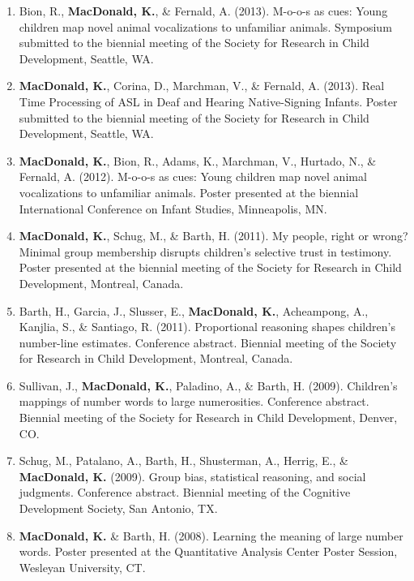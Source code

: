 \documentclass[10pt]{article}
\makeatletter
\newlength{\bibhang}
\newlength{\bibsep}
 {\@listi \global\bibsep\itemsep \global\advance\bibsep by\parsep}
\newenvironment{bibsection}%
        {\begin{enumerate}{}{%
       \setlength{\leftmargin}{\bibhang}%
       \setlength{\itemindent}{-\leftmargin}%
       \setlength{\itemsep}{\bibsep}%
       \setlength{\parsep}{\z@}%
        \setlength{\partopsep}{0pt}%
        \setlength{\topsep}{0pt}}}
        {\end{enumerate}\vspace{-.6\baselineskip}}
\makeatother
\begin{document}
\begin{bibsection}
\item Bion, R., {\bf MacDonald, K.}, \& Fernald, A. (2013). M-o-o-s as cues: Young children map novel animal vocalizations to unfamiliar animals. Symposium submitted to the biennial meeting of the Society for Research in Child Development, Seattle, WA.

\item {\bf MacDonald, K.}, Corina, D., Marchman, V., \& Fernald, A. (2013). Real Time Processing of ASL in Deaf and Hearing Native-Signing Infants. Poster submitted to the biennial meeting of the Society for Research in Child Development, Seattle, WA.

\item {\bf MacDonald, K.}, Bion, R., Adams, K., Marchman, V., Hurtado, N., \& Fernald, A. (2012).   M-o-o-s as cues: Young children map novel animal vocalizations to unfamiliar animals. Poster presented at the biennial International Conference on Infant Studies, Minneapolis, MN.

\item {\bf MacDonald, K.}, Schug, M., \& Barth, H. (2011). My people, right or wrong? Minimal group membership disrupts children's selective trust in testimony. Poster presented at the biennial meeting of the Society for Research in Child Development, Montreal, Canada.

\item Barth, H., Garcia, J., Slusser, E., {\bf MacDonald, K.}, Acheampong, A., Kanjlia, S., \& Santiago, R. (2011). Proportional reasoning shapes children's number-line estimates. Conference abstract. Biennial meeting of the Society for Research in Child Development, Montreal, Canada.

\item Sullivan, J., {\bf MacDonald, K.}, Paladino, A., \& Barth, H. (2009). Children's mappings of number words to large numerosities. Conference abstract. Biennial meeting of the Society for Research in Child Development, Denver, CO.

\item Schug, M., Patalano, A., Barth, H., Shusterman, A., Herrig, E., \& {\bf MacDonald, K.} (2009). Group bias, statistical reasoning, and social judgments. Conference abstract. Biennial meeting of the Cognitive Development Society, San Antonio, TX.

\item {\bf MacDonald, K.} \& Barth, H. (2008). Learning the meaning of large number words. Poster presented at the Quantitative Analysis Center Poster Session, Wesleyan University, CT.

\end{bibsection}
\end{document}
